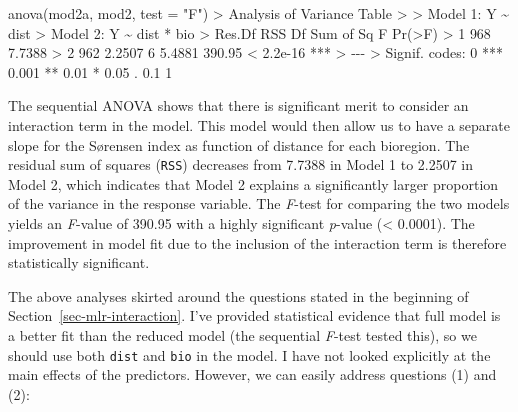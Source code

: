 \documentclass[
  letterpaper,
]{book}
\newenvironment{Shaded}{\begin{snugshade}}{\end{snugshade}}
\newcommand{\AttributeTok}[1]{\textcolor[rgb]{0.40,0.45,0.13}{#1}}
\newcommand{\DecValTok}[1]{\textcolor[rgb]{0.68,0.00,0.00}{#1}}
\newcommand{\ErrorTok}[1]{\textcolor[rgb]{0.68,0.00,0.00}{#1}}
\newcommand{\FloatTok}[1]{\textcolor[rgb]{0.68,0.00,0.00}{#1}}
\newcommand{\FunctionTok}[1]{\textcolor[rgb]{0.28,0.35,0.67}{#1}}
\newcommand{\NormalTok}[1]{\textcolor[rgb]{0.00,0.23,0.31}{#1}}
\newcommand{\SpecialCharTok}[1]{\textcolor[rgb]{0.37,0.37,0.37}{#1}}
\newcommand{\StringTok}[1]{\textcolor[rgb]{0.13,0.47,0.30}{#1}}
\begin{document}
\begin{Shaded}
\begin{Highlighting}[]
\FunctionTok{anova}\NormalTok{(mod2a, mod2, }\AttributeTok{test =} \StringTok{"F"}\NormalTok{)}
\SpecialCharTok{\textgreater{}}\NormalTok{ Analysis of Variance Table}
\SpecialCharTok{\textgreater{}} 
\ErrorTok{\textgreater{}}\NormalTok{ Model }\DecValTok{1}\SpecialCharTok{:}\NormalTok{ Y }\SpecialCharTok{\textasciitilde{}}\NormalTok{ dist}
\SpecialCharTok{\textgreater{}}\NormalTok{ Model }\DecValTok{2}\SpecialCharTok{:}\NormalTok{ Y }\SpecialCharTok{\textasciitilde{}}\NormalTok{ dist }\SpecialCharTok{*}\NormalTok{ bio}
\SpecialCharTok{\textgreater{}}\NormalTok{   Res.Df    RSS Df Sum of Sq      F    }\FunctionTok{Pr}\NormalTok{(}\SpecialCharTok{\textgreater{}}\NormalTok{F)    }
\SpecialCharTok{\textgreater{}} \DecValTok{1}    \DecValTok{968} \FloatTok{7.7388}                                  
\SpecialCharTok{\textgreater{}} \DecValTok{2}    \DecValTok{962} \FloatTok{2.2507}  \DecValTok{6}    \FloatTok{5.4881} \FloatTok{390.95} \SpecialCharTok{\textless{}} \FloatTok{2.2e{-}16} \SpecialCharTok{**}\ErrorTok{*}
\ErrorTok{\textgreater{}} \SpecialCharTok{{-}{-}{-}}
\ErrorTok{\textgreater{}}\NormalTok{ Signif. codes}\SpecialCharTok{:}  \DecValTok{0} \StringTok{\textquotesingle{}***\textquotesingle{}} \FloatTok{0.001} \StringTok{\textquotesingle{}**\textquotesingle{}} \FloatTok{0.01} \StringTok{\textquotesingle{}*\textquotesingle{}} \FloatTok{0.05} \StringTok{\textquotesingle{}.\textquotesingle{}} \FloatTok{0.1} \StringTok{\textquotesingle{} \textquotesingle{}} \DecValTok{1}
\end{Highlighting}
\end{Shaded}

The sequential ANOVA shows that there is significant merit to consider
an interaction term in the model. This model would then allow us to have
a separate slope for the Sørensen index as function of distance for each
bioregion. The residual sum of squares (\texttt{RSS}) decreases from
7.7388 in Model 1 to 2.2507 in Model 2, which indicates that Model 2
explains a significantly larger proportion of the variance in the
response variable. The \emph{F}-test for comparing the two models yields
an \emph{F}-value of 390.95 with a highly significant \emph{p}-value
(\textless{} 0.0001). The improvement in model fit due to the inclusion
of the interaction term is therefore statistically significant.

The above analyses skirted around the questions stated in the beginning
of Section~\ref{sec-mlr-interaction}. I've provided statistical evidence
that full model is a better fit than the reduced model (the sequential
\emph{F}-test tested this), so we should use both \texttt{dist} and
\texttt{bio} in the model. I have not looked explicitly at the main
effects of the predictors. However, we can easily address questions (1)
and (2):
\end{document}
